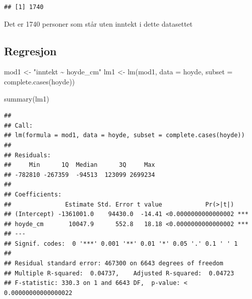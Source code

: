 \documentclass[
  12pt,
  norsk,
]{article}
\newenvironment{Shaded}{\begin{snugshade}}{\end{snugshade}}
\newcommand{\AttributeTok}[1]{\textcolor[rgb]{0.77,0.63,0.00}{#1}}
\newcommand{\DecValTok}[1]{\textcolor[rgb]{0.00,0.00,0.81}{#1}}
\newcommand{\FunctionTok}[1]{\textcolor[rgb]{0.00,0.00,0.00}{#1}}
\newcommand{\NormalTok}[1]{#1}
\newcommand{\OtherTok}[1]{\textcolor[rgb]{0.56,0.35,0.01}{#1}}
\newcommand{\SpecialCharTok}[1]{\textcolor[rgb]{0.00,0.00,0.00}{#1}}
\newcommand{\StringTok}[1]{\textcolor[rgb]{0.31,0.60,0.02}{#1}}
\begin{document}
\begin{Shaded}
\end{Shaded}

\begin{verbatim}
## [1] 1740
\end{verbatim}

Det er 1740 personer som står uten inntekt i dette datasettet

\hypertarget{regresjon}{%
\subsection{Regresjon}\label{regresjon}}

\begin{Shaded}
\begin{Highlighting}[]
\NormalTok{mod1 }\OtherTok{\textless{}{-}} \StringTok{"inntekt \textasciitilde{} hoyde\_cm"}
\NormalTok{lm1 }\OtherTok{\textless{}{-}} \FunctionTok{lm}\NormalTok{(mod1, }\AttributeTok{data =}\NormalTok{ hoyde, }\AttributeTok{subset =} \FunctionTok{complete.cases}\NormalTok{(hoyde))}
\end{Highlighting}
\end{Shaded}

\begin{Shaded}
\begin{Highlighting}[]
\FunctionTok{summary}\NormalTok{(lm1)}
\end{Highlighting}
\end{Shaded}

\begin{verbatim}
## 
## Call:
## lm(formula = mod1, data = hoyde, subset = complete.cases(hoyde))
## 
## Residuals:
##     Min      1Q  Median      3Q     Max 
## -782810 -267359  -94513  123099 2699234 
## 
## Coefficients:
##               Estimate Std. Error t value            Pr(>|t|)    
## (Intercept) -1361001.0    94430.0  -14.41 <0.0000000000000002 ***
## hoyde_cm       10047.9      552.8   18.18 <0.0000000000000002 ***
## ---
## Signif. codes:  0 '***' 0.001 '**' 0.01 '*' 0.05 '.' 0.1 ' ' 1
## 
## Residual standard error: 467300 on 6643 degrees of freedom
## Multiple R-squared:  0.04737,    Adjusted R-squared:  0.04723 
## F-statistic: 330.3 on 1 and 6643 DF,  p-value: < 0.00000000000000022
\end{verbatim}
\end{document}
